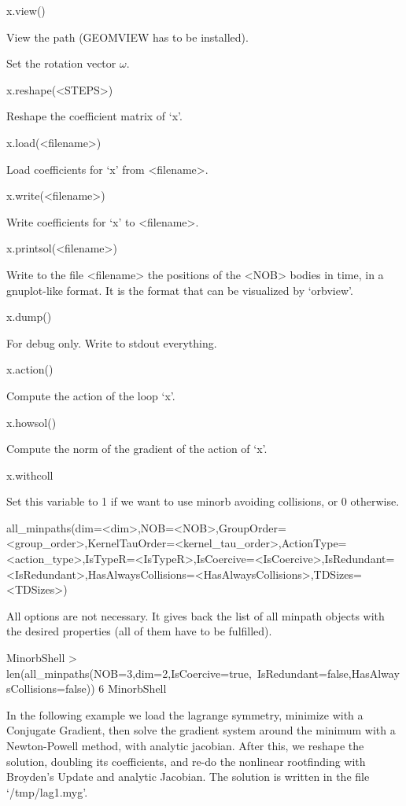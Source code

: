 \> x.view() 

View the path (GEOMVIEW has to be installed).


Set the rotation vector $\omega$.

\> x.reshape(<STEPS>)

Reshape the coefficient matrix of `x'.


\> x.load(<filename>)

Load coefficients for `x' from <filename>.

\> x.write(<filename>)

Write coefficients for `x' to <filename>.

\> x.printsol(<filename>)

Write to the file <filename> the positions of the <NOB> bodies
in time, in a gnuplot-like format. It is the format that 
can be visualized by `orbview'.

\> x.dump()

For debug only. Write to stdout everything.

\> x.action()

Compute the action of the loop `x'.

\> x.howsol()

Compute the norm of the gradient of the action of `x'.


\> x.withcoll

Set this variable to 1 if we want to use minorb avoiding collisions,
or 0 otherwise.


\) {\fmark all\_minpaths(dim=<dim>,NOB=<NOB>,GroupOrder=<group_order>,KernelTauOrder=<kernel_tau_order>,ActionType=<action_type>,IsTypeR=<IsTypeR>,IsCoercive=<IsCoercive>,IsRedundant=<IsRedundant>,HasAlwaysCollisions=<HasAlwaysCollisions>,TDSizes=<TDSizes>)}

All options are not necessary. It gives back the list of all
minpath objects with the desired properties (all of them have to 
be fulfilled).

\begintt
MinorbShell > len(all_minpaths(NOB=3,dim=2,IsCoercive=true,\
IsRedundant=false,HasAlwaysCollisions=false))
6
MinorbShell
\endtt


In the following example we load the lagrange symmetry,
minimize with a Conjugate Gradient, then 
solve the gradient system around the minimum with a Newton-Powell
method, with analytic jacobian. After this, we reshape
the solution, doubling its coefficients, and re-do the 
nonlinear rootfinding with Broyden's Update and analytic Jacobian.
The solution is written in the file `/tmp/lag1.myg'.

